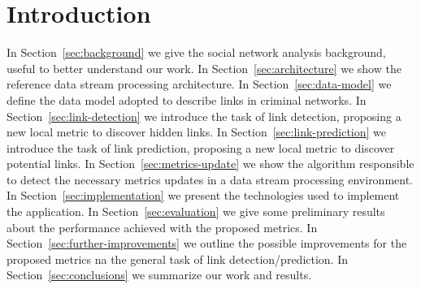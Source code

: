 \section{Introduction}
\label{sec:introduction}
In Section~\ref{sec:background} we give the social network analysis background, useful to better understand our work.
In Section~\ref{sec:architecture} we show the reference data stream processing architecture.
In Section~\ref{sec:data-model} we define the data model adopted to describe links in criminal networks.
In Section~\ref{sec:link-detection} we introduce the task of link detection, proposing a new local metric to discover hidden links.
In Section~\ref{sec:link-prediction} we introduce the task of link prediction, proposing a new local metric to discover potential links.
In Section~\ref{sec:metrics-update} we show the algorithm responsible to detect the necessary metrics updates in a data stream processing environment.
In Section~\ref{sec:implementation} we present the technologies used to implement the application.
In Section~\ref{sec:evaluation} we give some preliminary results about the performance achieved with the proposed metrics.
In Section~\ref{sec:further-improvements} we outline the possible improvements for the proposed metrics na the general task of link detection/prediction.
In Section~\ref{sec:conclusions} we summarize our work and results.
